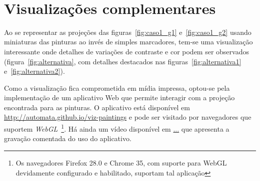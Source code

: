 \begin{figure}[htb]
  \hfill
   \\
\end{figure}

\afterpage{\blankpage}
\chapter{Visualizações complementares}
\label{ap:alternativa}

Ao se representar as projeções das figuras~\ref{fig:caso1_g1}
e~\ref{fig:caso1_g2} usando miniaturas das pinturas ao invés de simples
marcadores, tem-se uma visualização interessante onde detalhes de variações de
contraste e cor podem ser observados (figura~\ref{fig:alternativa}, com detalhes
destacados nas figuras~\ref{fig:alternativa1} e~\ref{fig:alternativa2}).

Como a visualização fica comprometida em mídia impressa, optou-se pela
implementação de um aplicativo Web que permite interagir com a
projeção encontrada para as pinturas.  O aplicativo está disponível em
\url{http://automata.github.io/viz-paintings} e pode ser visitado por
navegadores que suportem \textit{WebGL}~\footnote{Os navegadores
  Firefox 28.0 e Chrome 35, com suporte para WebGL devidamente
  configurado e habilitado, suportam tal aplicação}. Há ainda um vídeo
disponível em \url{...} que apresenta a gravação comentada do uso do
aplicativo.

